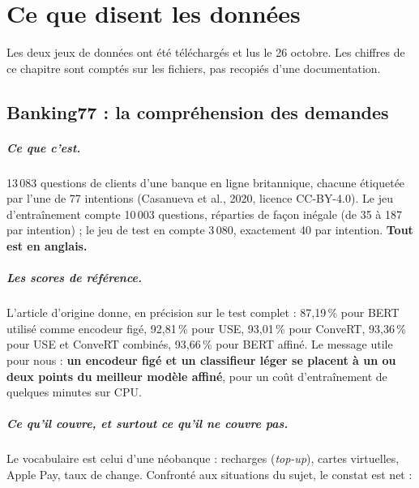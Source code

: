 \chapter{Ce que disent les données}
\label{ch:donnees}

Les deux jeux de données ont été téléchargés et lus le 26 octobre. Les chiffres de ce chapitre sont
comptés sur les fichiers, pas recopiés d'une documentation.

\section{Banking77 : la compréhension des demandes}

\paragraph{Ce que c'est.} 13\,083 questions de clients d'une banque en ligne britannique, chacune
étiquetée par l'une de 77 intentions (Casanueva et al., 2020, licence CC-BY-4.0). Le jeu
d'entraînement compte 10\,003 questions, réparties de façon inégale (de 35 à 187 par intention) ;
le jeu de test en compte 3\,080, exactement 40 par intention. \textbf{Tout est en anglais.}

\paragraph{Les scores de référence.} L'article d'origine donne, en précision sur le test complet :
87,19\,\% pour BERT utilisé comme encodeur figé, 92,81\,\% pour USE, 93,01\,\% pour ConveRT,
93,36\,\% pour USE et ConveRT combinés, 93,66\,\% pour BERT affiné. Le message utile pour nous :
\textbf{un encodeur figé et un classifieur léger se placent à un ou deux points du meilleur modèle
affiné}, pour un coût d'entraînement de quelques minutes sur CPU.

\paragraph{Ce qu'il couvre, et surtout ce qu'il ne couvre pas.} Le vocabulaire est celui d'une
néobanque : recharges (\emph{top-up}), cartes virtuelles, Apple Pay, taux de change. Confronté aux
situations du sujet, le constat est net :

